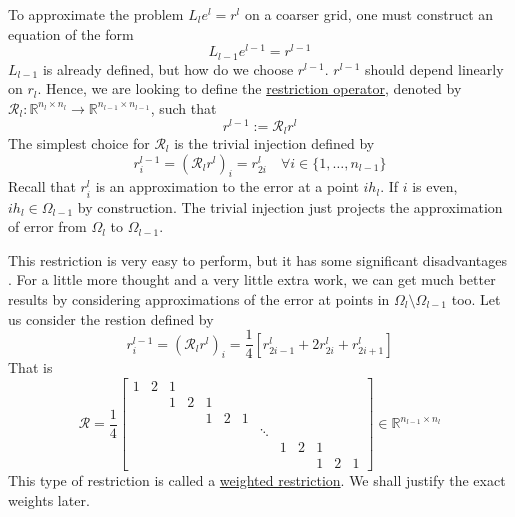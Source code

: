 \documentclass[a4paper,10pt,oneside]{book}
\theoremstyle{plain}%
\theoremstyle{definition}
\theoremstyle{remark}
\newcommand{\bbR}{\mathbb{R}}
\newcommand{\calR}{\mathcal{R}}
\newcommand{\hl}{h_l} %
\newcommand{\Omegal}{\Omega_l} %
\newcommand{\nl}{n_l} %
\newcommand{\Ll}{L_l}
\begin{document}
To approximate the problem $\Ll e^l=r^l$ on a coarser grid, one must construct
an equation of the form
\begin{equation}
 L_{l-1}e^{l-1}=r^{l-1}
\end{equation}
$L_{l-1}$ is already defined, but how do we choose $r^{l-1}$. $r^{l-1}$ should
depend linearly on $r_l$.  Hence, we are looking to define the
\underline{restriction operator}, denoted by
$\calR_l:\bbR^{\nl\times\nl}\to\bbR^{n_{l-1}\times n_{l-1}}$, such that
\begin{equation}
 r^{l-1}:=\calR_lr^l
\end{equation}
The simplest choice for $\calR_l$ is the trivial injection defined by
\begin{equation}
 r^{l-1}_i = (\calR_lr^l)_i = r^l_{2i}\quad\forall i\in\{1,\dotsc,n_{l-1}\}
\end{equation}
Recall that $r^l_i$ is an approximation to the error at a point $i\hl$. If $i$
is even, $i\hl\in\Omega_{l-1}$ by construction. The trivial injection just
projects the approximation of error from $\Omega_l$ to $\Omega_{l-1}$.

This restriction is very easy to perform, but it has some significant
disadvantages . For a
little more thought and a very little extra work, we can get much better results
by considering approximations of the error at points in
$\Omega_l\setminus\Omega_{l-1}$ too. Let us consider the restion defined by
\begin{equation}
 r^{l-1}_i=(\calR_lr^l)_i=\frac{1}{4}[r^l_{2i-1}+2r^l_{2i}+r^l_{2i+1}]
\end{equation}
That is
\begin{equation}
 \calR=\frac{1}{4}
   \begin{bmatrix}
    1 & 2 & 1 &   &   &   &   &   &   &   &   &   &   \\
      &   & 1 & 2 & 1 &   &   &   &   &   &   &   &   \\
      &   &   &   & 1 & 2 & 1 &   &   &   &   &   &   \\
      &   &   &   &   &   &   &\ddots&&   &   &   &   \\
      &   &   &   &   &   &   &   & 1 & 2 & 1 &   &   \\
      &   &   &   &   &   &   &   &   &   & 1 & 2 & 1
   \end{bmatrix}\in\bbR^{n_{l-1}\times n_l}
\end{equation}
This type of restriction is called a \underline{weighted restriction}. We shall
justify the exact weights later.
\end{document}
